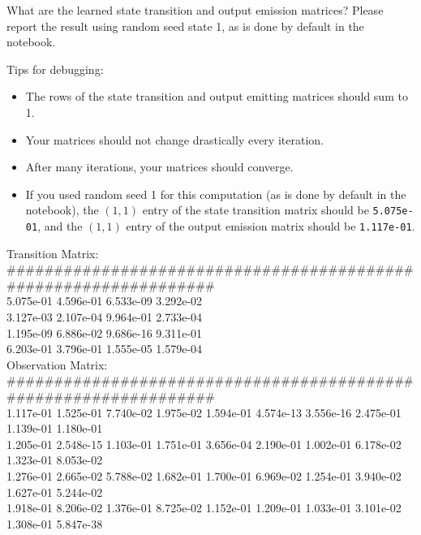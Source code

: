 What are the learned state transition and output emission matrices? Please report the result using random seed state 1, as is done by default in the notebook.

Tips for debugging:
\begin{itemize}
  \item The rows of the state transition and output emitting matrices should sum to 1.
  \item Your matrices should not change drastically every iteration.
  \item After many iterations, your matrices should converge.
  \item If you used random seed 1 for this computation (as is done by default in the notebook), the \((1,1)\) entry of the state transition matrix should be \verb|5.075e-01|, and the \((1,1)\) entry of the output emission matrix should be \verb|1.117e-01|.
\end{itemize}

\begin{solution}
  Transition Matrix:\\
{\footnotesize \#\#\#\#\#\#\#\#\#\#\#\#\#\#\#\#\#\#\#\#\#\#\#\#\#\#\#\#\#\#\#\#\#\#\#\#\#\#\#\#\#\#\#\#\#\#\#\#\#\#\#\#\#\#\#\#\#\#\#\#\#\#\#\#\#}\\
5.075e-01   4.596e-01   6.533e-09   3.292e-02   \\
3.127e-03   2.107e-04   9.964e-01   2.733e-04   \\
1.195e-09   6.886e-02   9.686e-16   9.311e-01   \\
6.203e-01   3.796e-01   1.555e-05   1.579e-04   \\


Observation Matrix:  \\
{\footnotesize \#\#\#\#\#\#\#\#\#\#\#\#\#\#\#\#\#\#\#\#\#\#\#\#\#\#\#\#\#\#\#\#\#\#\#\#\#\#\#\#\#\#\#\#\#\#\#\#\#\#\#\#\#\#\#\#\#\#\#\#\#\#\#\#\#}\\
1.117e-01   1.525e-01   7.740e-02   1.975e-02   1.594e-01   4.574e-13   3.556e-16   2.475e-01   1.139e-01   1.180e-01   \\
1.205e-01   2.548e-15   1.103e-01   1.751e-01   3.656e-04   2.190e-01   1.002e-01   6.178e-02   1.323e-01   8.053e-02   \\
1.276e-01   2.665e-02   5.788e-02   1.682e-01   1.700e-01   6.969e-02   1.254e-01   3.940e-02   1.627e-01   5.244e-02   \\
1.918e-01   8.206e-02   1.376e-01   8.725e-02   1.152e-01   1.209e-01   1.033e-01   3.101e-02   1.308e-01   5.847e-38   \\
\end{solution}

